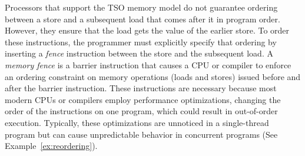 Processors that support the TSO memory model do not guarantee ordering between a store and a subsequent load that comes after it in program order. However, they ensure that the load gets the value of the earlier store.  To order these instructions, the programmer must explicitly specify that ordering by inserting a \emph{fence} instruction between the store and the subsequent load.
A \emph{memory fence} is a barrier instruction that causes a CPU or compiler to enforce an ordering constraint on memory operations (loads and stores) issued before and after the barrier instruction. These instructions are necessary because most modern CPUs or compilers employ performance optimizations, changing the order of the instructions on one program, which could result in out-of-order execution. Typically, these optimizations are unnoticed in a single-thread program but can cause unpredictable behavior in concurrent programs (See Example~\ref{ex:reordering}).

